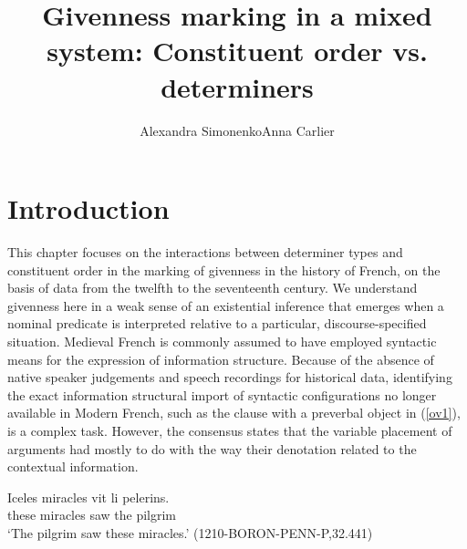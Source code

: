 \documentclass[output=paper,modfonts,nonflat]{langsci/langscibook}
\title{Givenness marking in a mixed system: Constituent order vs. determiners}
\author{Alexandra Simonenko\affiliation{Research Foundation Flanders \& Ghent University}\lastand Anna Carlier\affiliation{Université de Lille}}
\begin{document}
\maketitle
\section{Introduction}

This chapter focuses on the interactions between determiner types and \linebreak constituent order in the marking of givenness in the history of French, on the basis of data from the twelfth to the seventeenth century. We understand givenness here in a weak sense of an existential inference that emerges when a nominal predicate is interpreted relative to a particular, discourse-specified situation. Medieval French is commonly assumed to have employed syntactic means for the expression of information structure. Because of the absence of native speaker judgements and speech recordings for historical data, identifying the exact information structural import of syntactic configurations no longer available in Modern French, such as the clause with a preverbal object in (\ref{ov1}), is a complex task. However, the consensus states that the variable placement of arguments had mostly to do with the way their denotation related to the contextual information.

\ea \label{ov1}
\gll Iceles miracles vit li pelerins.\\
 these miracles saw the pilgrim\\
\glt  `The pilgrim saw these miracles.' \hfill (1210-BORON-PENN-P,32.441)\label{ex:ovs}
\z


\end{document}
